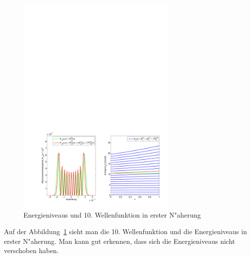 \begin{refsection}
\begin{figure}[h]	%
\centering
\includegraphics[width=0.7\textwidth]{anharmonisch/images/x4/Stoerung2Wellenfunktion.pdf}
\caption{Energieniveaus und 10. Wellenfunktion in erster N"aherung
\label{skript:x4_Stoerung1Wellenfunktion}}
\end{figure}

Auf der Abbildung~\ref{skript:x4_Stoerung1Wellenfunktion} sieht man die 10. Wellenfunktion und die Energieniveaus in erster N"aherung. Man kann gut erkennen, dass sich die Energieniveaus nicht verschoben haben.


\end{refsection}
